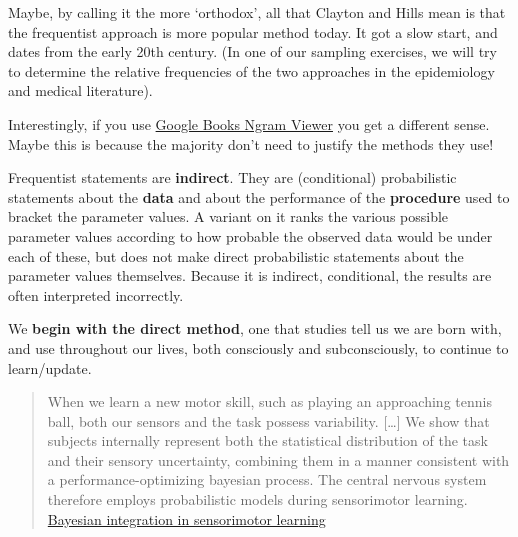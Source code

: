 \documentclass[]{book}
\begin{document}
Maybe, by calling it the more `orthodox', all that Clayton and Hills mean is that the frequentist approach is more popular method today. It got a slow start, and dates from the early 20th century. (In one of our sampling exercises, we will try to determine the relative frequencies of the two approaches in the epidemiology and medical literature).

Interestingly, if you use
\href{https://books.google.com/ngrams/graph?content=frequentist+approach\%2C+bayesian+approach\&case_insensitive=on\&year_start=1800\&year_end=2008\&corpus=15\&smoothing=3\&share=\&direct_url=t4\%3B\%2Cfrequentist\%20approach\%3B\%2Cc0\%3B\%2Cs0\%3B\%3Bfrequentist\%20approach\%3B\%2Cc0\%3B\%3BFrequentist\%20approach\%3B\%2Cc0\%3B\%3BFrequentist\%20Approach\%3B\%2Cc0\%3B.t4\%3B\%2Cbayesian\%20approach\%3B\%2Cc0\%3B\%2Cs0\%3B\%3BBayesian\%20approach\%3B\%2Cc0\%3B\%3BBayesian\%20Approach\%3B\%2Cc0\%3B\%3BBAYESIAN\%20APPROACH\%3B\%2Cc0\%3B\%3Bbayesian\%20approach\%3B\%2Cc0}{Google Books Ngram Viewer} you get a different sense. Maybe this is because the majority don't need to justify the methods they use!

Frequentist statements are \textbf{indirect}. They are (conditional) probabilistic statements about the \textbf{data} and about the performance of the \textbf{procedure} used to bracket the parameter values. A variant on it ranks the various possible parameter values according to how probable the observed data would be under each of these, but does not make direct probabilistic statements about the parameter values themselves. Because it is indirect, conditional, the results are often interpreted incorrectly.

We \textbf{begin with the direct method}, one that studies tell us we are born with, and use throughout our lives, both consciously and subconsciously, to continue to learn/update.

\begin{quote}
When we learn a new motor skill, such as playing an approaching
tennis ball, both our sensors and the task possess variability.
{[}\ldots{}{]} We show that subjects internally represent both the statistical
distribution of the task and their sensory uncertainty,
combining them in a manner consistent with a performance-optimizing bayesian process. The central nervous system therefore employs probabilistic models during sensorimotor learning. \href{http://www.medicine.mcgill.ca/epidemiology/hanley/bios601/ch10Bayes/nature02169.pdf}{Bayesian integration in sensorimotor learning}
\end{quote}
\end{document}
